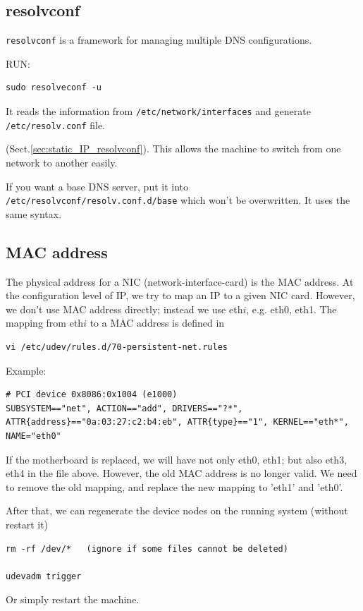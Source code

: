 \subsection{resolvconf}
\label{sec:resolvconf}

\verb!resolvconf! is a framework for managing multiple DNS configurations. 

RUN:
\begin{verbatim}
sudo resolveconf -u
\end{verbatim}
It reads the information from \verb!/etc/network/interfaces! and generate 
\verb!/etc/resolv.conf! file.



(Sect.\ref{sec:static_IP_resolvconf}). This allows the
machine to switch from one network to another easily.

If you want a base DNS server, put it into
\verb!/etc/resolvconf/resolv.conf.d/base! which won't be overwritten. It uses
the same syntax. 


\subsection{MAC address}
\label{sec:MAC-address}

The physical address for a NIC (network-interface-card) is the MAC address. At
the configuration level of IP, we try to map an IP to a given NIC card. However,
we don't use MAC address directly; instead we use eth$i$, e.g. eth0, eth1.
The mapping from eth$i$ to a MAC address is defined in
\begin{verbatim}
vi /etc/udev/rules.d/70-persistent-net.rules
\end{verbatim}
Example:
{\tiny
\begin{verbatim}
# PCI device 0x8086:0x1004 (e1000)
SUBSYSTEM=="net", ACTION=="add", DRIVERS=="?*", ATTR{address}=="0a:03:27:c2:b4:eb", ATTR{type}=="1", KERNEL=="eth*", NAME="eth0"
\end{verbatim}
}

If the motherboard is replaced, we will have not only eth0, eth1; but also
eth3, eth4 in the file above. However, the old MAC address is no longer valid.
We need to remove the old mapping, and replace the new mapping to 'eth1' and
'eth0'. 

After that, we can regenerate the device nodes on the running system (without
restart it)
\begin{verbatim}
rm -rf /dev/*   (ignore if some files cannot be deleted)

udevadm trigger
\end{verbatim}
Or simply restart the machine.


